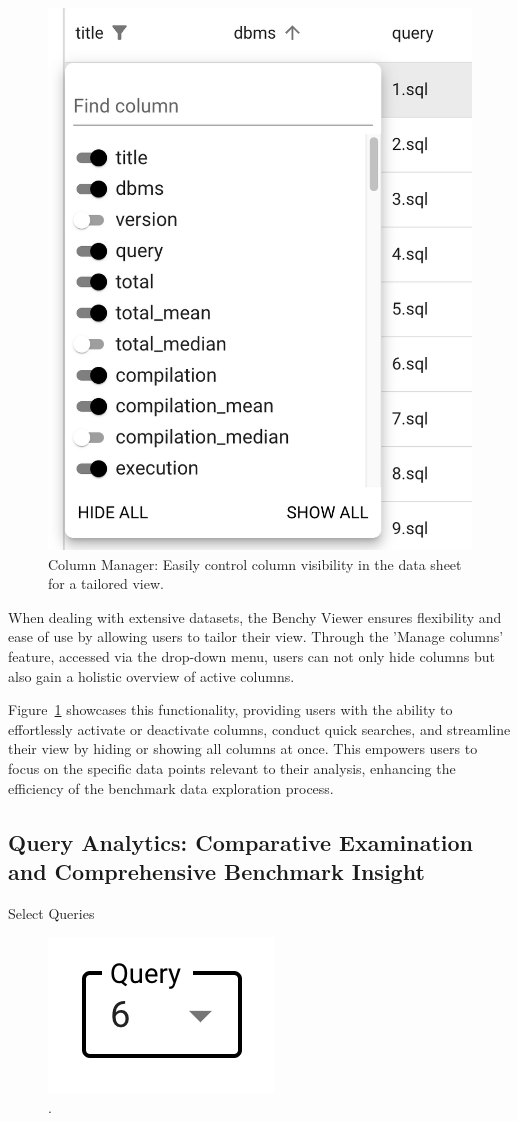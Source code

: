 
\begin{figure}[h]
  \centering
  \includegraphics[width=0.35\linewidth]{figures/data-viewer-manage-columns.png}
  \caption{Column Manager: Easily control column visibility in the data sheet for a tailored view.}
  \label{fig:data-viewer-manage-columns}
\end{figure}

When dealing with extensive datasets, the Benchy Viewer ensures flexibility and ease of use by allowing users to tailor their view. Through the 'Manage columns' feature, accessed via the drop-down menu, users can not only hide columns but also gain a holistic overview of active columns. 

Figure~\ref{fig:data-viewer-manage-columns} showcases this functionality, providing users with the ability to effortlessly activate or deactivate columns, conduct quick searches, and streamline their view by hiding or showing all columns at once. This empowers users to focus on the specific data points relevant to their analysis, enhancing the efficiency of the benchmark data exploration process.




\subsection{Query Analytics: Comparative Examination and Comprehensive Benchmark Insight }
Select Queries


\begin{figure}[h]
  \centering
  \includegraphics[width=0.15\linewidth]{figures/select-query.png}
  \caption{.}
  \label{fig:select-query}
\end{figure}

